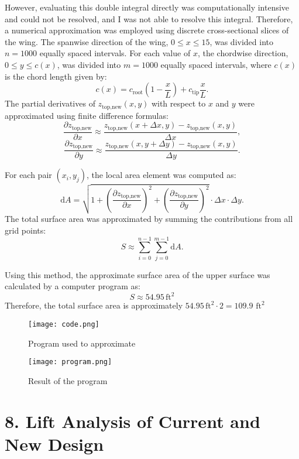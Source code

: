 \documentclass[12pt]{article}
\begin{document}
However, evaluating this double integral directly was computationally intensive and could not be resolved, and I was not able to resolve this integral. Therefore, a numerical approximation was employed using discrete cross-sectional slices of the wing. The spanwise direction of the wing, \(0 \leq x \leq 15\), was divided into \(n = 1000\) equally spaced intervals. For each value of \(x\), the chordwise direction, \(0 \leq y \leq c(x)\), was divided into \(m = 1000\) equally spaced intervals, where \(c(x)\) is the chord length given by:
   \[
   c(x) = c_{\text{root}} \left( 1 - \frac{x}{L} \right) + c_{\text{tip}} \frac{x}{L}.
   \]
The partial derivatives of \(z_{\text{top,new}}(x, y)\) with respect to \(x\) and \(y\) were approximated using finite difference formulas:
   \[
   \frac{\partial z_{\text{top,new}}}{\partial x} \approx \frac{z_{\text{top,new}}(x + \Delta x, y) - z_{\text{top,new}}(x, y)}{\Delta x},
   \]
   \[
   \frac{\partial z_{\text{top,new}}}{\partial y} \approx \frac{z_{\text{top,new}}(x, y + \Delta y) - z_{\text{top,new}}(x, y)}{\Delta y}.
   \]

For each pair \((x_i, y_j)\), the local area element was computed as:
   \[
   \mathrm{d}A = \sqrt{1 + \left(\frac{\partial z_{\text{top,new}}}{\partial x}\right)^2 + \left(\frac{\partial z_{\text{top,new}}}{\partial y}\right)^2} \cdot \Delta x \cdot \Delta y.
   \]
The total surface area was approximated by summing the contributions from all grid points:
   \[
   S \approx \sum_{i=0}^{n-1} \sum_{j=0}^{m-1} \mathrm{d}A.
   \]


Using this method, the approximate surface area of the upper surface was calculated by a computer program as:
\[
S \approx 54.95 \, \text{ft}^2 
\]
Therefore, the total surface area is approximately $54.95 \, \text{ft}^2 \cdot 2 = 109.9 \text{ ft}^2$

\begin{figure}[H]
    \centering
    \texttt{[image: code.png]}
    \caption{Program used to approximate}
\end{figure}
\begin{figure}[H]
    \centering
    \texttt{[image: program.png]}
    \caption{Result of the program}
\end{figure}


\section*{8. Lift Analysis of Current and New Design}
\end{document}
